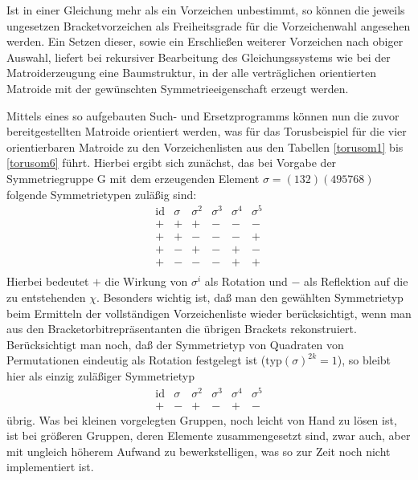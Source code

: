 Ist in einer Gleichung mehr als ein Vorzeichen unbestimmt, so können die
jeweils ungesetzen Bracketvorzeichen als Freiheitsgrade für die Vorzeichenwahl
angesehen werden. Ein Setzen dieser, sowie ein Erschließen weiterer Vorzeichen
nach obiger Auswahl, liefert bei rekursiver Bearbeitung des Gleichungssystems
wie bei der Matroiderzeugung eine Baumstruktur, in der alle verträglichen
orientierten Matroide mit der gewünschten Symmetrieeigenschaft erzeugt werden.

Mittels eines so aufgebauten Such- und Ersetzprogramms können nun die
zuvor bereitgestellten Matroide orientiert werden, was für das Torusbeispiel
für die vier orientierbaren Matroide zu den Vorzeichenlisten aus den Tabellen
\ref{torusom1} bis \ref{torusom6} führt. Hierbei ergibt sich zunächst, das
bei Vorgabe der Symmetriegruppe G mit dem erzeugenden Element
$\sigma = (132)(495768)$ folgende Symmetrietypen zuläßig sind:
$$\begin{array}{c|c|c|c|c|c}
\mbox{id} & \sigma & \sigma^2 & \sigma^3 & \sigma^4 & \sigma^5 \\
\hline
+ & + & + & - & - & - \\
+ & + & - & - & - & + \\
+ & - & + & - & + & - \\
+ & - & - & - & + & + \\
\end{array}$$
Hierbei bedeutet $+$ die Wirkung von $\sigma^i$ als Rotation und $-$ als
Reflektion auf die zu entstehenden $\chi$. Besonders wichtig ist, daß man
den gewählten Symmetrietyp beim Ermitteln der vollständigen Vorzeichenliste
wieder berücksichtigt, wenn man aus den Bracketorbitrepräsentanten die
übrigen Brackets rekonstruiert. Berücksichtigt man noch, daß der Symmetrietyp
von Quadraten von Permutationen eindeutig als Rotation festgelegt ist
($\mbox{typ}(\sigma)^{2k}=1$), so bleibt hier als einzig zuläßiger
Symmetrietyp
$$\begin{array}{c|c|c|c|c|c}
\mbox{id} & \sigma & \sigma^2 & \sigma^3 & \sigma^4 & \sigma^5 \\
\hline
+ & - & + & - & + & -
\end{array}$$
übrig. Was bei kleinen vorgelegten Gruppen, noch leicht von Hand zu lösen
ist, ist bei größeren Gruppen, deren Elemente zusammengesetzt sind, zwar
auch, aber mit ungleich höherem Aufwand zu bewerkstelligen, was so zur Zeit
noch nicht implementiert ist.

